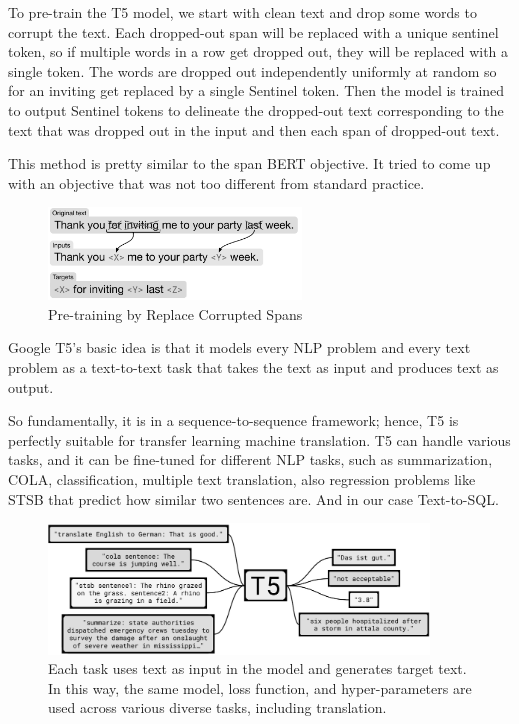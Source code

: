 To pre-train the T5 model, we start with clean text and drop some words to corrupt the text. Each dropped-out span will be replaced with a unique sentinel token, so if multiple words in a row get dropped out, they will be replaced with a single token. The words are dropped out independently uniformly at random so for an inviting get replaced by a single Sentinel token. Then the model is trained to output Sentinel tokens to delineate the dropped-out text corresponding to the text that was dropped out in the input and then each span of dropped-out text.

This method is pretty similar to the span BERT objective. It tried to come up with an objective that was not too different from standard practice.

\begin{figure}[h]
    \centering
    \includegraphics[width=0.6\textwidth]{pics/picard/t5-fine.png}
    \caption{Pre-training by Replace Corrupted Spans \cite{raffel_exploring_2020}}
\end{figure}

Google T5's basic idea is that it models every NLP problem and every text problem as a text-to-text task that takes the text as input and produces text as output.

So fundamentally, it is in a sequence-to-sequence framework; hence, T5 is perfectly suitable for transfer learning machine translation.
T5 can handle various tasks, and it can be fine-tuned for different NLP tasks, such as summarization, \ac{COLA}, classification, multiple text translation, also regression problems like STSB  that predict how similar two sentences are. And in our case Text-to-SQL.

\begin{figure}[h]
    \centering
    \includegraphics[width=0.9\textwidth]{pics/picard/t5-task.png}
    \caption{Each task uses text as input in the model and generates target text. In this way, the same model, loss function, and hyper-parameters are used across various diverse tasks, including translation. \cite{raffel_exploring_2020}}
\end{figure}

